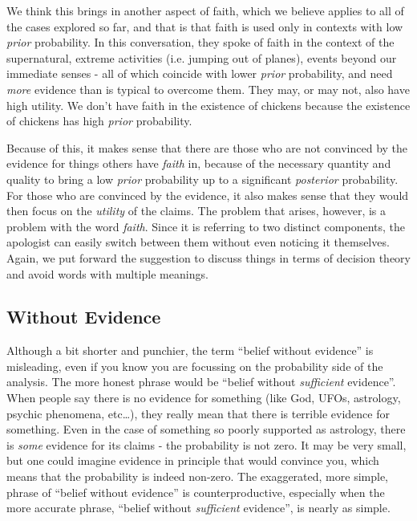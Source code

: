 We think this brings in another aspect of faith, which we believe applies to all of the cases explored so far, and that is that faith is used only in contexts with low \emph{prior} probability. In this conversation,
they spoke of faith in the context of the supernatural, extreme
activities (i.e. jumping out of planes), events beyond our immediate
senses - all of which coincide with lower \emph{prior} probability, and
need \emph{more} evidence than is typical to overcome them. They may, or
may not, also have high utility. We don't have faith in the existence of
chickens because the existence of chickens has high \emph{prior}
probability.

Because of this, it makes sense that there are those who are not convinced by the evidence for things others have {\em faith} in, because of the necessary quantity and quality to bring a low {\em prior} probability up to a significant {\em posterior} probability.  For those who are convinced by the evidence, it also makes sense that they would then focus on the {\em utility} of the claims.  The problem that arises, however, is a problem with the word {\em faith}.  Since it is referring to two distinct components, the apologist can easily switch between them
without even noticing it themselves. Again, we put forward the suggestion to discuss things in terms of decision theory and avoid words with multiple meanings.  

\subsection{Without Evidence}

Although a bit shorter and punchier, the term ``belief without evidence'' is misleading, even if you know you are focussing on the probability side of the analysis.  The more honest phrase would be ``belief without \emph{sufficient} evidence''. When people say
there is no evidence for something (like God, UFOs, astrology, psychic
phenomena, etc\ldots{}), they really mean that there is terrible
evidence for something. Even in the case of something so poorly supported as astrology, there is \emph{some} evidence for its claims - the probability is not zero.  It may be very small, but one could imagine evidence in principle that would convince you, which means that the probability is indeed non-zero. The exaggerated, more
simple, phrase of ``belief without evidence'' is counterproductive,
especially when the more accurate phrase, ``belief without
\emph{sufficient} evidence'', is nearly as simple. 

